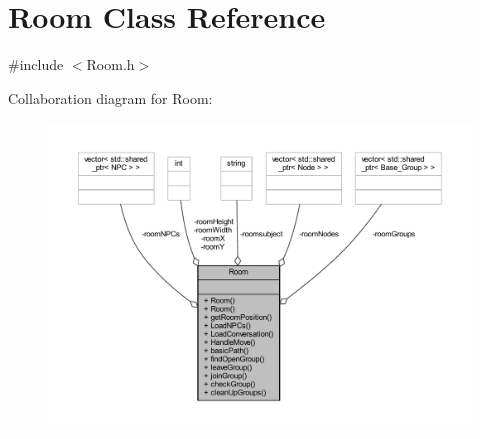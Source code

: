 \hypertarget{class_room}{}\section{Room Class Reference}
\label{class_room}


{\ttfamily \#include $<$Room.\+h$>$}



Collaboration diagram for Room\+:\nopagebreak
\begin{figure}[H]
\begin{center}
\leavevmode
\includegraphics[width=350pt]{class_room__coll__graph}
\end{center}
\end{figure}
